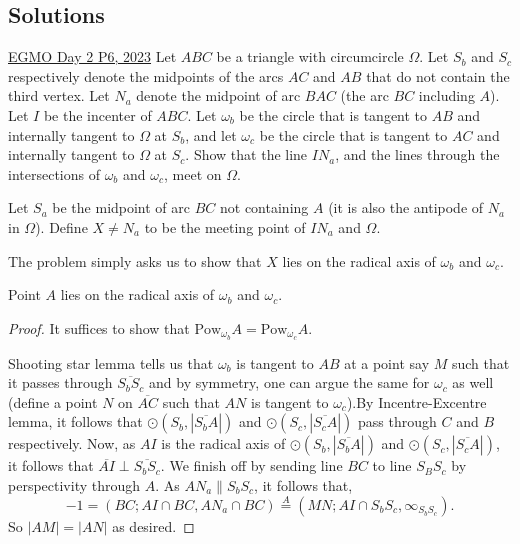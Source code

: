 \subsection{Solutions}
\begin{problem}{1}{\href{https://artofproblemsolving.com/community/c6h3054399p27522960}{EGMO Day 2 P6, 2023}}
	Let $ABC$ be a triangle with circumcircle $\Omega$. Let $S_b$ and $S_c$ respectively denote the midpoints of the arcs $AC$ and $AB$ that do not contain the third vertex. Let $N_a$ denote the midpoint of arc $BAC$ (the arc $BC$ including $A$). Let $I$ be the incenter of $ABC$. Let $\omega_b$ be the circle that is tangent to $AB$ and internally tangent to $\Omega$ at $S_b$, and let $\omega_c$ be the circle that is tangent to $AC$ and internally tangent to $\Omega$ at $S_c$. Show that the line $IN_a$, and the lines through the intersections of $\omega_b$ and $\omega_c$, meet on $\Omega$.
	\begin{solution} Let $S_a$ be the midpoint of arc $BC$ not containing $A$ (it is also the antipode of $N_a$ in $\Omega$). Define $X\neq N_a$ to be the meeting point of $IN_a$ and $\Omega$.\\
	\par The problem simply asks us to show that $X$ lies on the radical axis of $\omega_b$ and $\omega_c$.
	
	\begin{claim}
	Point $A$ lies on the radical axis of $\omega_b$ and $\omega_c$.
	\end{claim}
	\begin{proof} It suffices to show that $\text{Pow}_{\omega_b}A=\text{Pow}_{\omega_c}A$.
	\par Shooting star lemma tells us that $\omega_b$ is tangent to $AB$ at a point say $M$ such that it passes through $\overline{S_bS_c}$ and by symmetry, one can argue the same for $\omega_c$ as well (define a point $N$ on $\overline{AC}$ such that $AN$ is tangent to $\omega_c$).By Incentre-Excentre lemma, it follows that $\odot (S_b, |\overline{S_bA}|)$ and $\odot (S_c, |\overline{S_cA}|)$ pass through $C$ and $B$ respectively. Now, as $AI$ is the radical axis of $\odot (S_b, |\overline{S_bA}|)$ and $\odot (S_c, |\overline{S_cA}|)$, it follows that $\overline{AI}\perp\overline{S_bS_c}$. We finish off by sending line $BC$ to line $S_BS_c$ by perspectivity through $A$. As $AN_a\parallel S_bS_c$, it follows that,
	$$-1=(BC; AI\cap BC,AN_a\cap BC)\overset{A}{=}(MN; AI\cap S_bS_c,\infty_{S_bS_c}).$$
	So $|AM|=|AN|$ as desired.
	\end{proof}
	

\end{solution}
\end{problem}
